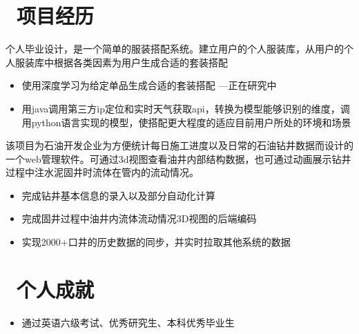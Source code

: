 \documentclass{resume}
\begin{document}
\section{\faUsers\ 项目经历}
\begin{onehalfspacing}
个人毕业设计，是一个简单的服装搭配系统。建立用户的个人服装库，从用户的个人服装库中根据各类因素为用户生成合适的套装搭配
\begin{itemize}
  \item 使用深度学习为给定单品生成合适的套装搭配  ---正在研究中
  \item 用java调用第三方ip定位和实时天气获取api，转换为模型能够识别的维度，调用python语言实现的模型，使搭配更大程度的适应目前用户所处的环境和场景
\end{itemize}
\end{onehalfspacing}

\begin{onehalfspacing}
    该项目为石油开发企业为方便统计每日施工进度以及日常的石油钻井数据而设计的一个web管理软件。可通过3d视图查看油井内部结构数据，也可通过动画展示钻井过程中注水泥固井时流体在管内的流动情况。
\begin{itemize}
  \item 完成钻井基本信息的录入以及部分自动化计算
  \item 完成固井过程中油井内流体流动情况3D视图的后端编码
  \item 实现2000+口井的历史数据的同步，并实时拉取其他系统的数据
\end{itemize}
\end{onehalfspacing}

\section{\faHeartO\ 个人成就}
\begin{itemize}[parsep=0.5ex]
  \item 通过英语六级考试、优秀研究生、本科优秀毕业生
\end{itemize}


%
%
\end{document}
